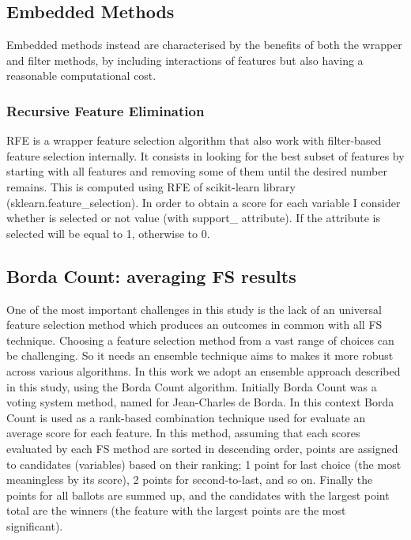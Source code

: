 \subsection{Embedded Methods}
Embedded methods instead are characterised by the benefits of both the wrapper and filter methods, by including interactions of features but also having a reasonable computational cost.\par
\bigskip
\subsubsection{Recursive Feature Elimination}
RFE is a wrapper feature selection algorithm that also work with filter-based feature selection internally.\newline
It consists in looking for the best subset of features by starting with all features and removing some of them until the desired number remains.\newline
This is computed using RFE of scikit-learn library (sklearn.feature\_selection).
In order to obtain a score for each variable I consider whether is selected or not value (with support\_ attribute).
If the attribute is selected will be equal to 1, otherwise to 0.
\pagebreak
\subsection{Borda Count: averaging FS results}
One of the most important challenges in this study is the lack of an universal feature selection method which produces an outcomes in common with all FS technique. Choosing a feature selection method from a vast range of choices can be challenging. \newline
So it needs an ensemble technique aims to makes it more robust across various algorithms. In this work we adopt an ensemble approach described in this study\cite{sarkar2014robust}, using the Borda Count algorithm. Initially Borda Count was a voting system method, named for Jean-Charles de Borda\cite{borda1784memoire}.\newline
In this context Borda Count is used as a rank-based combination technique used for evaluate an average score for each feature. In this method, assuming that each scores evaluated by each FS method are sorted in descending order, points are assigned to candidates (variables) based on their ranking; 1 point for last choice (the most meaningless by its score), 2 points for second-to-last, and so on. Finally the points for all ballots are summed up, and the candidates with the largest point total are the winners (the feature with the largest points are the most significant).
\par


